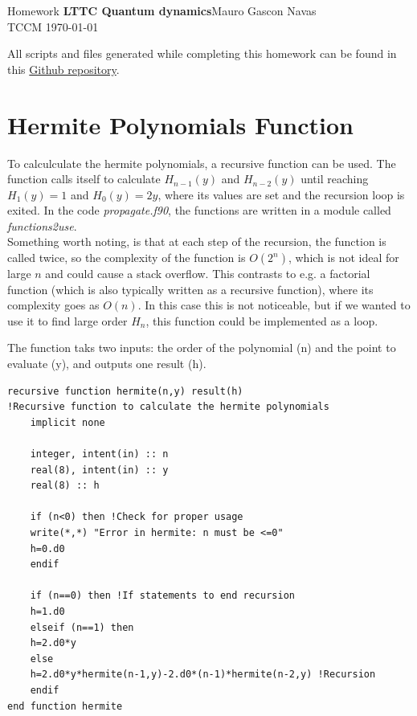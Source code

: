 \documentclass{cis320}
\begin{document}
\noindent Homework \textbf{LTTC Quantum dynamics}\hfill  Mauro Gascon Navas\\
TCCM \today

\hrulefill
\par
\vspace{1cm} 
All scripts and files generated while completing this homework can be found in this \textcolor{blue}{\href{https://github.com/EliteSushi/LTTC2025/tree/main/Quantum_Dynamics}{Github repository}}.

\section{Hermite Polynomials Function}

To calculculate the hermite polynomials, a recursive function can be used. The function calls itself to calculate $H_{n-1}(y)$ and $H_{n-2}(y)$ until reaching $H_1(y)=1$ and $H_0(y)=2y$, where its values are set and the recursion loop is exited. In the code \textit{propagate.f90}, the functions are written in a module called \textit{functions2use}.\\
Something worth noting, is that at each step of the recursion, the function is called twice, so the complexity of the function is $O(2^n)$, which is not ideal for large $n$ and could cause a stack overflow. This contrasts to e.g. a factorial function (which is also typically written as a recursive function), where its complexity goes as $O(n)$. In this case this is not noticeable, but if we wanted to use it to find large order $H_{n}$, this function could be implemented as a loop.\\
\par 
The function taks two inputs: the order of the polynomial (n) and the point to evaluate (y), and outputs one result (h).
    \begin{lstlisting}[caption=Recursive function to calculate hermite polynomials]
recursive function hermite(n,y) result(h) 
!Recursive function to calculate the hermite polynomials
    implicit none

    integer, intent(in) :: n
    real(8), intent(in) :: y
    real(8) :: h

    if (n<0) then !Check for proper usage
    write(*,*) "Error in hermite: n must be <=0"
    h=0.d0
    endif

    if (n==0) then !If statements to end recursion
    h=1.d0
    elseif (n==1) then
    h=2.d0*y
    else
    h=2.d0*y*hermite(n-1,y)-2.d0*(n-1)*hermite(n-2,y) !Recursion
    endif
end function hermite \end{lstlisting}
\end{document}
